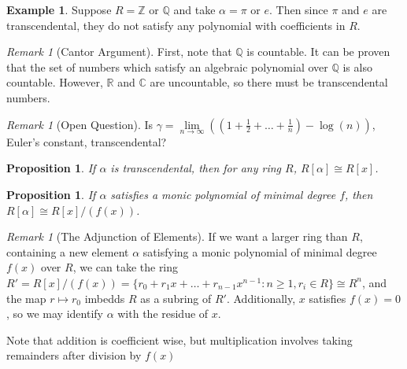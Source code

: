 \documentclass[12pt]{article}
\newtheorem{prop}[thm]{Proposition}
\theoremstyle{definition}
\newtheorem{eg}[thm]{Example}
\theoremstyle{remark}
\newtheorem{rmk}[thm]{Remark}
\numberwithin{equation}{section}
\newcommand\C{\mathbb C}    %
\newcommand\R{\mathbb R}    %
\newcommand\Z{\mathbb Z}    %
\newcommand\Q{\mathbb Q}    %
\begin{document}
\vspace{15pt}

\begin{eg}
        Suppose $R = \Z$ or $\Q$ and take $\alpha = \pi$ or $e$. Then since $\pi$ and $e$ are transcendental, they do not satisfy any polynomial with coefficients in $R$.
\end{eg}


\vspace{15pt}

\begin{rmk}[Cantor Argument]
        First, note that $\Q$ is countable. It can be proven that the set of numbers which satisfy an algebraic polynomial over $\Q$ is also countable. However, $\R$ and $\C$ are uncountable, so there must be transcendental numbers.
\end{rmk}

\vspace{15pt}


\begin{rmk}[Open Question]
        Is $\gamma = \lim\limits_{n\rightarrow\infty}\left(\left(1+\frac{1}{2}+\hdots+\frac{1}{n}\right)-\log(n)\right)$, Euler's constant, transcendental?
\end{rmk}


\vspace{15pt}

\begin{prop}
        If $\alpha$ is transcendental, then for any ring $R$, $R[\alpha] \cong R[x]$.
\end{prop}

\vspace{15pt}

\begin{prop}
        If $\alpha$ satisfies a monic polynomial of minimal degree $f$, then $R[\alpha] \cong R[x]/(f(x))$.
\end{prop}

\vspace{15pt}


\begin{rmk}[The Adjunction of Elements]
        If we want a larger ring than $R$, containing a new element $\alpha$ satisfying a monic polynomial of minimal degree $f(x)$ over $R$, we can take the ring $R' = R[x]/(f(x)) = \{r_0+r_1x+\hdots+r_{n-1}x^{n-1}: n\geq 1, r_i \in R\}\cong R^n$, and the map $r\mapsto r_0$ imbedds $R$ as a subring of $R'$. Additionally, $x$ satisfies $f(x) = 0$, so we may identify $\alpha$ with the residue of $x$.


        Note that addition is coefficient wise, but multiplication involves taking remainders after division by $f(x)$
\end{rmk}
\end{document}
